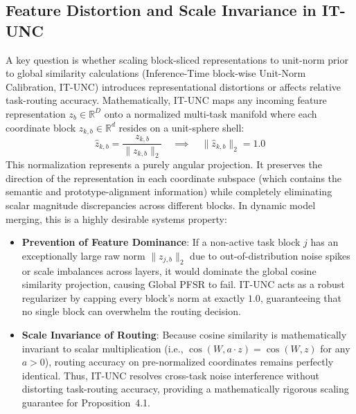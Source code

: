 \documentclass{article}
\theoremstyle{plain}
\theoremstyle{definition}
\theoremstyle{remark}
\begin{document}
\subsection{Feature Distortion and Scale Invariance in IT-UNC}
A key question is whether scaling block-sliced representations to unit-norm prior to global similarity calculations (Inference-Time block-wise Unit-Norm Calibration, IT-UNC) introduces representational distortions or affects relative task-routing accuracy. 
Mathematically, IT-UNC maps any incoming feature representation $z_b \in \mathbb{R}^D$ onto a normalized multi-task manifold where each coordinate block $z_{k, b} \in \mathbb{R}^d$ resides on a unit-sphere shell:
\begin{equation}
\hat{z}_{k, b} = \frac{z_{k, b}}{\|z_{k, b}\|_2} \quad \implies \quad \|\hat{z}_{k, b}\|_2 = 1.0
\end{equation}
This normalization represents a purely angular projection. It preserves the direction of the representation in each coordinate subspace (which contains the semantic and prototype-alignment information) while completely eliminating scalar magnitude discrepancies across different blocks. In dynamic model merging, this is a highly desirable systems property:
\begin{itemize}
    \item \textbf{Prevention of Feature Dominance}: If a non-active task block $j$ has an exceptionally large raw norm $\|z_{j, b}\|_2$ due to out-of-distribution noise spikes or scale imbalances across layers, it would dominate the global cosine similarity projection, causing Global PFSR to fail. IT-UNC acts as a robust regularizer by capping every block's norm at exactly $1.0$, guaranteeing that no single block can overwhelm the routing decision.
    \item \textbf{Scale Invariance of Routing}: Because cosine similarity is mathematically invariant to scalar multiplication (i.e., $\cos(W, a \cdot z) = \cos(W, z)$ for any $a > 0$), routing accuracy on pre-normalized coordinates remains perfectly identical. Thus, IT-UNC resolves cross-task noise interference without distorting task-routing accuracy, providing a mathematically rigorous scaling guarantee for Proposition~4.1.
\end{itemize}
\end{document}
